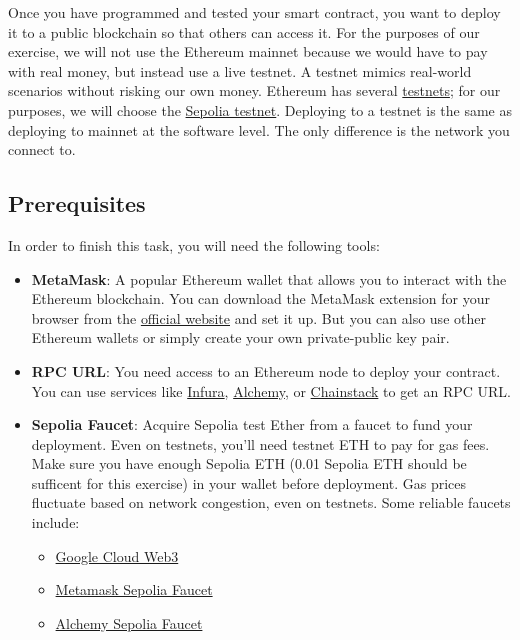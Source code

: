 \documentclass[12pt]{article}
\begin{document}
Once you have programmed and tested your smart contract, you want to deploy it to a public blockchain so that others can access it. For the purposes of our exercise, we will not use the Ethereum mainnet because we would have to pay with real money, but instead use a live testnet. A testnet mimics real-world scenarios without risking our own money. Ethereum has several \href{https://ethereum.org/en/developers/docs/networks/#ethereum-testnets}{testnets}; for our purposes, we will choose the \href{https://sepolia.dev/}{Sepolia testnet}. Deploying to a testnet is the same as deploying to mainnet at the software level. The only difference is the network you connect to.

\subsection{Prerequisites}

In order to finish this task, you will need the following tools:

\begin{itemize}
    \item \textbf{MetaMask}: A popular Ethereum wallet that allows you to interact with the Ethereum blockchain. You can download the MetaMask extension for your browser from the \href{https://metamask.io/}{official website} and set it up. But you can also use other Ethereum wallets or simply create your own private-public key pair.
    
    \item \textbf{RPC URL}: You need access to an Ethereum node to deploy your contract. You can use services like \href{https://infura.io/}{Infura}, \href{https://www.alchemy.com/}{Alchemy}, or \href{https://chainstack.com/}{Chainstack} to get an RPC URL.
    
    \item \textbf{Sepolia Faucet}: Acquire Sepolia test Ether from a faucet to fund your deployment. Even on testnets, you'll need testnet ETH to pay for gas fees. Make sure you have enough Sepolia ETH (0.01 Sepolia ETH should be sufficent for this exercise) in your wallet before deployment. Gas prices fluctuate based on network congestion, even on testnets. Some reliable faucets include:
    \begin{itemize}
        \item \href{https://cloud.google.com/application/web3/faucet/ethereum/sepolia}{Google Cloud Web3}
        \item \href{https://docs.metamask.io/developer-tools/faucet/}{Metamask Sepolia Faucet}
        \item \href{https://www.alchemy.com/faucets/ethereum-sepolia}{Alchemy Sepolia Faucet}
    \end{itemize}
\end{itemize}
\end{document}
